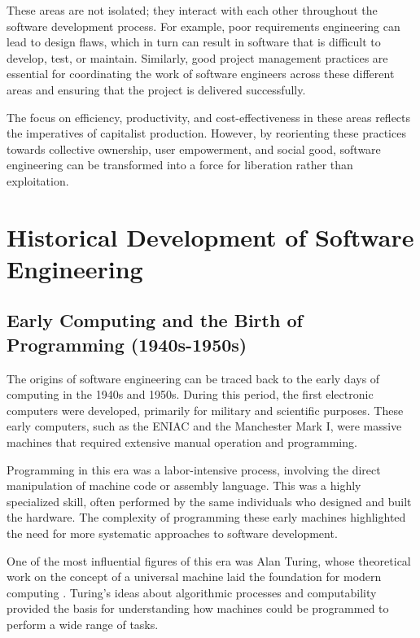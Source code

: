 \begin{refsection}
\begin{multicols}{2}
{These areas are not isolated; they interact with each other throughout the software development process. For example, poor requirements engineering can lead to design flaws, which in turn can result in software that is difficult to develop, test, or maintain. Similarly, good project management practices are essential for coordinating the work of software engineers across these different areas and ensuring that the project is delivered successfully.

The focus on efficiency, productivity, and cost-effectiveness in these areas reflects the imperatives of capitalist production. However, by reorienting these practices towards collective ownership, user empowerment, and social good, software engineering can be transformed into a force for liberation rather than exploitation.
}
\end{multicols}
\newpage
\section{Historical Development of Software Engineering}
\begin{multicols}{2}
{\small
\subsection{Early Computing and the Birth of Programming (1940s-1950s)}

The origins of software engineering can be traced back to the early days of computing in the 1940s and 1950s. During this period, the first electronic computers were developed, primarily for military and scientific purposes. These early computers, such as the ENIAC and the Manchester Mark I, were massive machines that required extensive manual operation and programming.

Programming in this era was a labor-intensive process, involving the direct manipulation of machine code or assembly language. This was a highly specialized skill, often performed by the same individuals who designed and built the hardware. The complexity of programming these early machines highlighted the need for more systematic approaches to software development.

One of the most influential figures of this era was Alan Turing, whose theoretical work on the concept of a universal machine laid the foundation for modern computing \cite[p. 43]{hodges1983}. Turing's ideas about algorithmic processes and computability provided the basis for understanding how machines could be programmed to perform a wide range of tasks.

}
\end{multicols}
\end{refsection}
